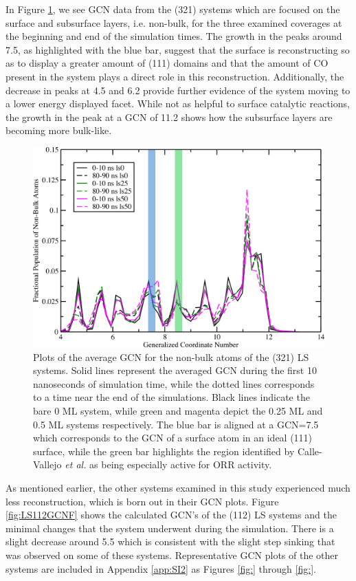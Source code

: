 In Figure \ref{fig:LS321GCNF}, we see GCN data from the  (321) systems
which are focused on the surface and subsurface layers, i.e. non-bulk, for the
three examined coverages at  the beginning and end of the simulation times. The
growth in the peaks around 7.5, as highlighted with the blue bar, suggest that
the surface is reconstructing so as to display a greater amount of (111)
domains and that the amount of CO present in the system plays a direct role in
this reconstruction. Additionally, the decrease in peaks at 4.5 and 6.2 provide
further evidence of the system moving to a lower energy displayed facet. While
not as helpful to surface catalytic reactions, the growth in the peak at a GCN
of 11.2 shows how the subsurface layers are becoming more bulk-like.

\begin{figure}[p!]
  \includegraphics[width=\linewidth]{../figures/chap4/321ls_GCNF.pdf}
  \caption{Plots of the average GCN for the non-bulk atoms of the  (321)
LS systems.  Solid lines represent the averaged GCN during the first 10
nanoseconds of simulation time, while the dotted lines corresponds to a time near
the end of the simulations. Black lines indicate the bare 0 ML system, while
green and magenta depict the 0.25 ML and 0.5 ML systems respectively. The blue
bar is aligned at a GCN=7.5 which corresponds to the GCN of a surface atom in
an ideal  (111) surface, while the green bar highlights the region
identified by Calle-Vallejo {\em et al.} as being especially active for ORR
activity.\citep{Calle-Vallejo:2015qq}}
\label{fig:LS321GCNF}
\end{figure}

As mentioned earlier, the other systems examined in this study experienced much
less reconstruction, which is born out in their GCN plots. Figure
\ref{fig:LS112GCNF} shows the calculated GCN's of the  (112) LS
systems and the minimal changes that the system underwent during the
simulation. There is a slight decrease around 5.5 which is consistent with the
slight step sinking that was observed on some of these systems. Representative GCN plots
of the other systems are included in Appendix \ref{app:SI2} as Figures \ref{fig:} through \ref{fig:}.

